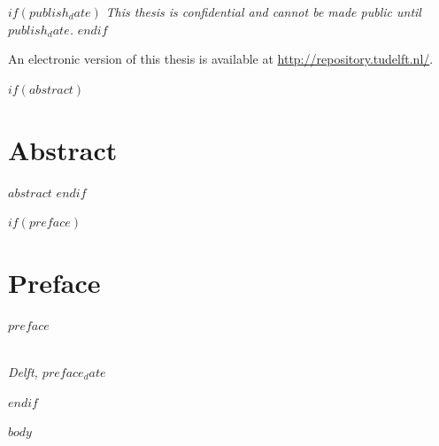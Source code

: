 \documentclass[dvipsnames,whitelogo]{tudelft-report}
\begin{document}
\begin{titlepage}
\begin{center}
$if(publish_date)$
\bigskip
\bigskip
\emph{This thesis is confidential and cannot be made public until $publish_date$.}
$endif$

\bigskip
\bigskip
An electronic version of this thesis is available at \url{http://repository.tudelft.nl/}.



\end{center}


\end{titlepage}

$if(abstract)$
\chapter*{Abstract}
$abstract$
$endif$

$if(preface)$
\chapter*{Preface}

$preface$

\begin{flushright}
{\makeatletter\itshape
    \@author \\
    Delft, $preface_date$
\makeatother}
\end{flushright}

$endif$

\setcounter{tocdepth}{1}
\tableofcontents

\mainmatter

$body$

\appendix

%

\nocite{*}

% 


\end{document}

